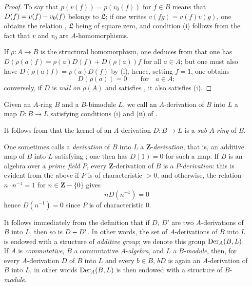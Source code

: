 \begin{proof}
To say that $p(v(f))=p(v_0(f))$ for $f\in B$ means that $D(f)=v(f)- v_0(f)$ belongs to $\mathfrak{L}$; if one writes $v(fg)=v(f)v(g)$, one obtains the relation , $\mathfrak{L}$ being of square zero, and condition (i) follows from the fact that $v$ and $v_0$ are $A$-homomorphisms.

If $\rho:A\to B$ is the structural homomorphism, one deduces from  that one has $D(\rho(a)f)=\rho(a)D(f)+D(\rho(a))f$ for all $a\in A$; but one must also have $D(\rho(a)f)=\rho(a)D(f)$ by (i), hence, setting $f=1$, one obtains
\[
  D(\rho(a)) = 0 \qquad\text{for}\quad a\in A;
\]
conversely, if $D$ is \emph{null on} $\rho(A)$ and satisfies , it also satisfies (i).
\end{proof}

\begin{definition}[20.1.2]
\label{0.20.1.2}
Given an $A$-ring $B$ and a $B$-bimodule $L$, we call an $A$-derivation of $B$ into $L$ a map $D:B\to L$ satisfying conditions \textup{(i)} and \textup{(ii)} of \textup{}.
\end{definition}

It follows from  that the kernel of an $A$-derivation $D:B\to L$ is a \emph{sub-}$A$-\emph{ring} of $B$.

One sometimes calls a \emph{derivation} of $B$ into $L$ a $\mathbf{Z}$-\emph{derivation}, that is, an additive map of $B$ into $L$ satisfying ; one then has $D(1)=0$ for such a map.
If $B$ is an algebra over a \emph{prime field} $P$, every $\mathbf{Z}$-derivation of $B$ is a $P$-\emph{derivation}: this is evident from the above if $P$ is of characteristic $>0$, and otherwise, the relation $n\cdot n^{-1}=1$ for $n\in\mathbf{Z}-\{0\}$ gives
\[
  nD(n^{-1}) = 0
\]
hence $D(n^{-1})=0$ since $P$ is of characteristic $0$.

It follows immediately from the definition  that if $D$, $D'$ are two $A$-derivations of $B$ into $L$, then so is $D- D'$.
In other words, the set of $A$-derivations of $B$ into $L$ is endowed with a structure of \emph{additive group}; we denote this group $\operatorname{Der}_A(B,L)$.
If $A$ is \emph{commutative}, $B$ a commutative $A$-\emph{algebra}, and $L$ a $B$-\emph{module}, then, for every $A$-derivation $D$ of $B$ into $L$ and every $b\in B$, $bD$ is again an $A$-derivation of $B$ into $L$, in other words $\operatorname{Der}_A(B,L)$ is then endowed with a structure of $B$-\emph{module}.

